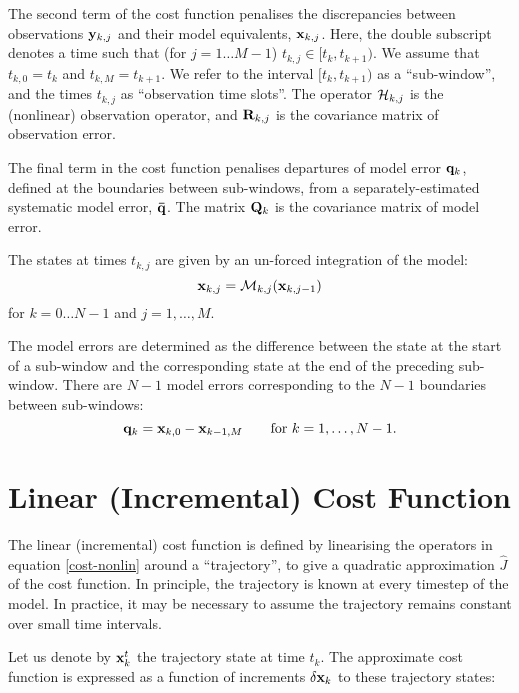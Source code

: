 \documentclass[12pt]{article}
\newcommand{\vect}[1]{{\bf #1}}                         %
\newcommand{\mat}[1]{{\bf #1}}                          %
\newcommand{\calH}{{\cal H}}                           %
\newcommand{\calM}{{\cal M}}                           %
\begin{document}
The second term of the cost function penalises the discrepancies between
observations $\vect{y}_{k,j}$ and their model equivalents, $\vect{x}_{k,j}$.
Here, the double subscript denotes a time such that (for
$j=1 \ldots M-1$) $t_{k,j} \in [t_k , t_{k+1} )$. We assume that
$t_{k,0} = t_k$ and $t_{k,M} = t_{k+1}$.
We refer to the interval $[t_k , t_{k+1} )$ as a ``sub-window'', and the
times $t_{k,j}$ as ``observation time slots''.
The operator $\calH_{k,j}$ is the (nonlinear) observation operator, and
$\mat{R}_{k,j}$ is the covariance matrix of observation error.

The final term in the cost function penalises departures of model error
$\vect{q}_k$, defined at the boundaries between sub-windows, from a
separately-estimated systematic model error, $\vect{\bar q}$. The matrix
$\mat{Q}_k$ is the covariance matrix of model error.

The states at times $t_{k,j}$ are given by an un-forced integration of
the model:
\begin{equation}
\label{nonlin-propagate-eqn}
   \vect{x}_{k,j} = \calM_{k,j} (\vect{x}_{k,j-1} )
\end{equation}
for $k=0 \ldots N-1$ and $j=1 , \ldots , M$.

The model errors are determined as the difference between the state at the
start of a sub-window and the corresponding state at the end of the preceding
sub-window. There are $N-1$ model errors corresponding to the $N-1$
boundaries between sub-windows:
\begin{equation}
\label{nonlin-model-error-eqn}
   \vect{q}_k = \vect{x}_{k,0} - \vect{x}_{k-1,M}
               \qquad\mbox{for $k=1 , \ldots , N-1$}.
\end{equation}

\section{Linear (Incremental) Cost Function}

The linear (incremental) cost function is defined by linearising the
operators in equation \ref{cost-nonlin} around a ``trajectory'', to give
a quadratic approximation ${\hat J}$ of the cost function. In principle, the
trajectory is known at every timestep of the model. In practice, it may
be necessary to assume the trajectory remains constant over small time
intervals.

Let us denote by $\vect{x}_k^t$ the trajectory state at time $t_k$.
The approximate cost function is expressed as a function of increments
$\delta\vect{x}_k$ to these trajectory states:
\end{document}
